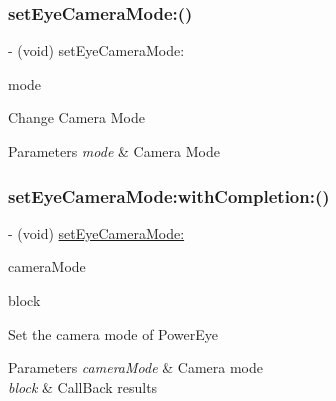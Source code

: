 \subsubsection{\texorpdfstring{set\+Eye\+Camera\+Mode\+:()}{setEyeCameraMode:()}}
{\footnotesize\ttfamily -\/ (void) set\+Eye\+Camera\+Mode\+: \begin{DoxyParamCaption}\item[{(P\+V\+Eye\+Camera\+Shoot\+Mode)}]{mode }\end{DoxyParamCaption}}

Change Camera Mode


\begin{DoxyParams}{Parameters}
{\em mode} & Camera Mode \\
\hline
\end{DoxyParams}
\mbox{\label{interface_p_v_eye_camera_a9cd6118458266a821aef37f89ac7ea79}} 
\subsubsection{\texorpdfstring{set\+Eye\+Camera\+Mode\+:with\+Completion\+:()}{setEyeCameraMode:withCompletion:()}}
{\footnotesize\ttfamily -\/ (void) \hyperlink{interface_p_v_eye_camera_aeb9dbca0f5efc52162ffa13365040f8d}{set\+Eye\+Camera\+Mode\+:} \begin{DoxyParamCaption}\item[{(P\+V\+Eye\+Camera\+Mode)}]{camera\+Mode }\item[{withCompletion:(P\+V\+Completion\+Block)}]{block }\end{DoxyParamCaption}}

Set the camera mode of Power\+Eye


\begin{DoxyParams}{Parameters}
{\em camera\+Mode} & Camera mode \\
\hline
{\em block} & Call\+Back results \\
\hline
\end{DoxyParams}
\mbox{\label{interface_p_v_eye_camera_a8bd31021966adc98ebec45dcac0df252}} 
